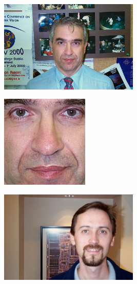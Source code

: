 \begin{figure}[H]
\centering

\begin{subfigure}{0.65\textwidth}
\begin{subfigure}{.33\textwidth}
  \centering
  \includegraphics[width=0.95\textwidth]{img/fdResult1/input63.png}
  \caption{}
\end{subfigure}%
\begin{subfigure}{.33\textwidth}
  \centering
  \includegraphics[width=0.6\textwidth]{img/fdResult1/output63.png}
  \caption{}
\end{subfigure}%
\end{subfigure}%
\begin{subfigure}{0.65\textwidth}
\begin{subfigure}{.33\textwidth}
  \centering
  \includegraphics[width=0.95\textwidth]{img/fdResult1/input18.png}

\end{subfigure}
\end{subfigure}
\end{figure}
